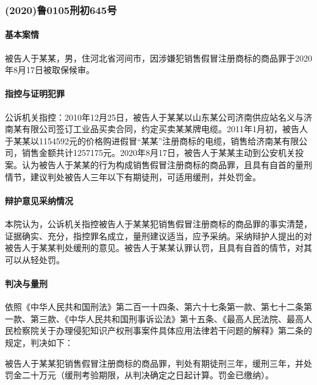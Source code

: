 \documentclass[
    a4paper
    ]{ctexart}
\begin{document}
{\begin{sloppy}
\subsubsection*{(2020)鲁0105刑初645号}
\paragraph{基本案情}
被告人于某某，男，住河北省河间市，因涉嫌犯销售假冒注册商标的商品罪于2020年8月17日被取保候审。

\paragraph{指控与证明犯罪}
公诉机关指控：2010年12月25日，被告人于某某以山东某公司济南供应站名义与济南某有限公司签订工业品买卖合同，约定买卖某某牌电缆。2011年1月初，被告人于某某以1154592元的价格购进假冒“某某”注册商标的电缆，销售给济南某有限公司，销售金额共计1257175元。2020年8月17日，被告人于某某主动到公安机关投案。认为被告人于某某的行为构成销售假冒注册商标的商品罪，且具有自首的量刑情节，建议判处被告人三年以下有期徒刑，可适用缓刑，并处罚金。

\paragraph{辩护意见采纳情况}
本院认为，公诉机关指控被告人于某某犯销售假冒注册商标的商品罪的事实清楚，证据确实、充分，指控罪名成立，量刑建议适当，应予采纳。采纳辩护人提出的对被告人于某某判处缓刑的意见。被告人于某某认罪认罚，且具有自首的情节，对其可以从轻处罚。

\paragraph{判决与量刑}
依照《中华人民共和国刑法》第二百一十四条、第六十七条第一款、第七十二条第一款、第三款、《中华人民共和国刑事诉讼法》第十五条、《最高人民法院、最高人民检察院关于办理侵犯知识产权刑事案件具体应用法律若干问题的解释》第二条的规定，判决如下：

被告人于某某犯销售假冒注册商标的商品罪，判处有期徒刑三年，缓刑三年，并处罚金二十万元（缓刑考验期限，从判决确定之日起计算。罚金已缴纳）。
            \end{sloppy}
    }
\end{document}
